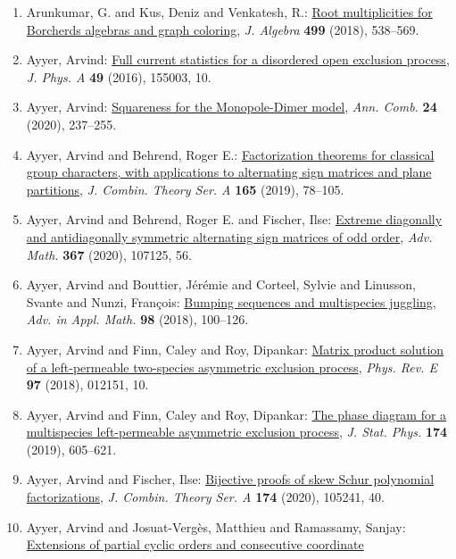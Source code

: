 \begin{enumerate}
{algebras}, \emph{J. Combin. Theory Ser. A} {\bf 183} (2021), Paper No. 105492, 28.
\item Arunkumar, G. and Kus, Deniz and Venkatesh, R.: \href{https://doi.org/10.1016/j.jalgebra.2017.11.050}{Root multiplicities for {B}orcherds algebras and graph
coloring}, \emph{J. Algebra} {\bf 499} (2018), 538--569.
\item Ayyer, Arvind: \href{https://doi.org/10.1088/1751-8113/49/15/155003}{Full current statistics for a disordered open exclusion
process}, \emph{J. Phys. A} {\bf 49} (2016), 155003, 10.
\item Ayyer, Arvind: \href{https://doi.org/10.1007/s00026-019-00480-5}{Squareness for the {M}onopole-{D}imer model}, \emph{Ann. Comb.} {\bf 24} (2020), 237--255.
\item Ayyer, Arvind and Behrend, Roger E.: \href{https://doi.org/10.1016/j.jcta.2019.01.001}{Factorization theorems for classical group characters, with
applications to alternating sign matrices and plane
partitions}, \emph{J. Combin. Theory Ser. A} {\bf 165} (2019), 78--105.
\item Ayyer, Arvind and Behrend, Roger E. and Fischer, Ilse: \href{https://doi.org/10.1016/j.aim.2020.107125}{Extreme diagonally and antidiagonally symmetric alternating
sign matrices of odd order}, \emph{Adv. Math.} {\bf 367} (2020), 107125, 56.
\item Ayyer, Arvind and Bouttier, J\'{e}r\'{e}mie and Corteel, Sylvie and
Linusson, Svante and Nunzi, Fran\c{c}ois: \href{https://doi.org/10.1016/j.aam.2018.03.001}{Bumping sequences and multispecies juggling}, \emph{Adv. in Appl. Math.} {\bf 98} (2018), 100--126.
\item Ayyer, Arvind and Finn, Caley and Roy, Dipankar: \href{https://doi.org/10.1103/physreve.97.012151}{Matrix product solution of a left-permeable two-species
asymmetric exclusion process}, \emph{Phys. Rev. E} {\bf 97} (2018), 012151, 10.
\item Ayyer, Arvind and Finn, Caley and Roy, Dipankar: \href{https://doi.org/10.1007/s10955-018-2183-x}{The phase diagram for a multispecies left-permeable asymmetric
exclusion process}, \emph{J. Stat. Phys.} {\bf 174} (2019), 605--621.
\item Ayyer, Arvind and Fischer, Ilse: \href{https://doi.org/10.1016/j.jcta.2020.105241}{Bijective proofs of skew {S}chur polynomial factorizations}, \emph{J. Combin. Theory Ser. A} {\bf 174} (2020), 105241, 40.
\item Ayyer, Arvind and Josuat-Verg\`es, Matthieu and Ramassamy,
Sanjay: \href{https://doi.org/10.5802/ahl.33}{Extensions of partial cyclic orders and consecutive coordinate
}
\end{enumerate}
